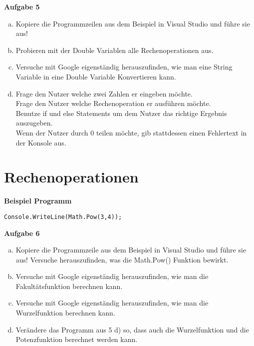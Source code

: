 \documentclass[a4paper,12pt]{article}
\newcommand{\Aufgabe}[1]{
  {
  \vspace*{0.5cm}
  \textsf{\textbf{Aufgabe #1}}
  \vspace*{0.2cm}
  
  }
}
\newcommand{\Definition}[1]{
  {
  \vspace*{0.5cm}
  \textsf{\textbf{#1}}
  \vspace*{0.2cm}
  
  }
}
\begin{document}
\Aufgabe{5} 
\begin{enumerate}[a)]
\item
Kopiere die Programmzeilen aus dem Beispiel in Visual Studio und führe sie aus!
\item
Probieren mit der Double Variablen alle Rechenoperationen aus.
\item
Versuche mit Google eigenständig herauszufinden, wie man eine String Variable in eine Double Variable Konvertieren kann.
\item
Frage den Nutzer welche zwei Zahlen er eingeben möchte. \\
Frage den Nutzer welche Rechenoperation er ausführen möchte. \\
Benutze if und else Statements um dem Nutzer das richtige Ergebnis auszugeben. \\
Wenn der Nutzer durch 0 teilen möchte, gib stattdessen einen Fehlertext in der Konsole aus.

\end{enumerate}

\section{Rechenoperationen}
\Definition{Beispiel Programm}

\begin{verbatim}
Console.WriteLine(Math.Pow(3,4));
\end{verbatim}

\Aufgabe{6} 
\begin{enumerate}[a)]
\item
Kopiere die Programmzeile aus dem Beispiel in Visual Studio und führe sie aus! Versuche herauszufinden, was die Math.Pow() Funktion bewirkt.
\item
Versuche mit Google eigenständig herauszufinden, wie man die Fakultätsfunktion berechnen kann.
\item
Versuche mit Google eigenständig herauszufinden, wie man die Wurzelfunktion berechnen kann.
\item
Verändere das Programm aus 5 d) so, dass auch die Wurzelfunktion und die Potenzfunktion berechnet werden kann.
\end{enumerate}

\end{document}
